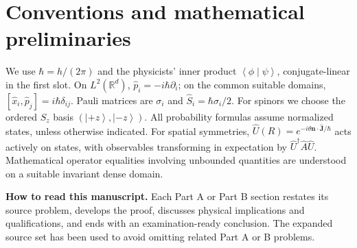 \documentclass[11pt,a4paper]{article}
\theoremstyle{definition}
\newcommand{\ket}[1]{\left|#1\right\rangle}
\newcommand{\ip}[2]{\left\langle#1\middle|#2\right\rangle}
\begin{document}
\begin{abstract}
These notes give self-contained derivations for the consolidated set of fifteen Part A short-answer and ten Part B long-answer quantum mechanics questions (25 in all), drawn from two overlapping blocks of the supplied course assignment PDF. Calculations proceed from canonical commutation relations, Hilbert-space projection, and unitary symmetry operators: Pauli and ladder algebra, generators of spatial and temporal translations, parity and inversion, tensor transformation types, hydrogenic parity and electric-dipole selection rules, spin measurements, and conservation laws are proved explicitly. A two-particle harmonic interaction is separated into center-of-mass and relative degrees of freedom. The consequences of parity and continuous rotations are treated, including selection rules, conserved angular momentum, and the scope of rotational degeneracy. Assumptions, phase conventions and limits of the statements are stated explicitly. This is an instructional synthesis of coursework solutions, not a research claim.
\end{abstract}
\tableofcontents
\bigskip
\section*{Conventions and mathematical preliminaries}
We use \(\hbar=h/(2\pi)\) and the physicists' inner product \(\ip{\phi}{\psi}\), conjugate-linear in the first slot. On \(L^2(\mathbb R^d)\), \(\hat p_i=-i\hbar\partial_i\); on the common suitable domains, \([\hat x_i,\hat p_j]=i\hbar\delta_{ij}\). Pauli matrices are \(\sigma_i\) and \(\hat S_i=\hbar\sigma_i/2\). For spinors we choose the ordered \(S_z\) basis \((\ket{+z},\ket{-z})\). All probability formulas assume normalized states, unless otherwise indicated. For spatial symmetries, \(\hat U(R)=e^{-i\theta\mathbf n\cdot\hat{\mathbf J}/\hbar}\) acts actively on states, with observables transforming in expectation by \(\hat U^\dagger\hat A\hat U\). Mathematical operator equalities involving unbounded quantities are understood on a suitable invariant dense domain.\par
\noindent\textbf{How to read this manuscript.} Each Part A or Part B section restates its source problem, develops the proof, discusses physical implications and qualifications, and ends with an examination-ready conclusion. The expanded source set has been used to avoid omitting related Part A or B problems.
\end{document}
